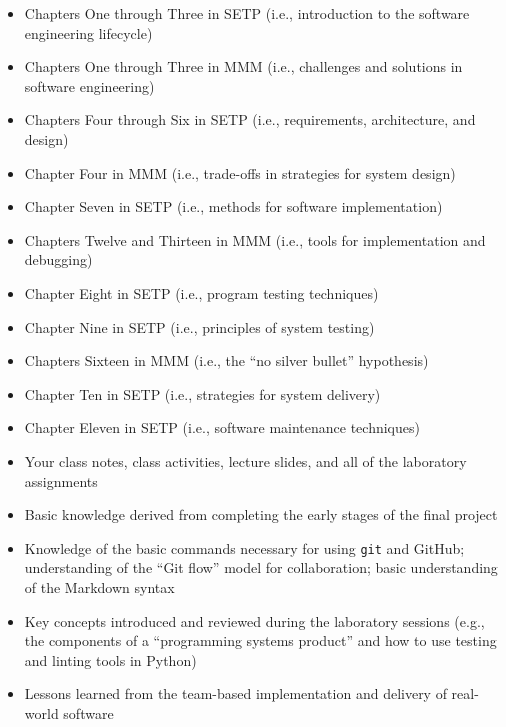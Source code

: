 \documentclass[11pt]{article}
\begin{document}
\begin{itemize}

  \item Chapters One through Three in SETP (i.e., introduction to the software
    engineering lifecycle)

  \item Chapters One through Three in MMM (i.e., challenges and solutions in
    software engineering)

  \item Chapters Four through Six in SETP (i.e., requirements, architecture, and design)

  \item Chapter Four in MMM (i.e., trade-offs in strategies for system design)

  \item Chapter Seven in SETP (i.e., methods for software implementation)

  \item Chapters Twelve and Thirteen in MMM (i.e., tools for implementation and
    debugging)

  \item Chapter Eight in SETP (i.e., program testing techniques)

  \item Chapter Nine in SETP (i.e., principles of system testing)

  \item Chapters Sixteen in MMM (i.e., the ``no silver bullet'' hypothesis)

  \item Chapter Ten in SETP (i.e., strategies for system delivery)

  \item Chapter Eleven in SETP (i.e., software maintenance techniques)

  \item Your class notes, class activities, lecture slides, and all of the
    laboratory assignments

  \item Basic knowledge derived from completing the early stages of the final project

  \item Knowledge of the basic commands necessary for using {\tt git} and
    GitHub; understanding of the ``Git flow'' model for collaboration; basic
    understanding of the Markdown syntax

  \item Key concepts introduced and reviewed during the laboratory sessions
    (e.g., the components of a ``programming systems product'' and how to use
    testing and linting tools in Python)

  \item Lessons learned from the team-based implementation and delivery of
    real-world software

\end{itemize}
\end{document}
